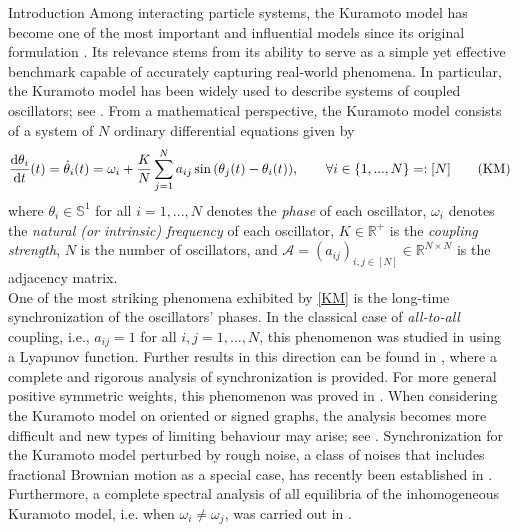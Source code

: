 \documentclass{article}
\theoremstyle{definition}
\newcommand{\R}{\mathbb{R}}
\begin{document}
\begin{section}{Introduction}
Among interacting particle systems, the Kuramoto model has become one of the most important and influential models since its original formulation \cite{kuramoto2003chemical}. Its relevance stems from its ability to serve as a simple yet effective benchmark capable of accurately capturing real-world phenomena. In particular, the Kuramoto model has been widely used to describe systems of coupled oscillators; see \cite{kuramoto2005self}. From a mathematical perspective, the Kuramoto model consists of a system of $N$ ordinary differential equations given by
\begin{equation}\label{KM}
    \frac{\textnormal{d}\theta_i}{\textnormal{d}t}(t)=\dot{\theta}_i(t)=\omega_i+\frac{K}{N}\sum_{j=1}^Na_{ij}\sin{\left(\theta_j(t)-\theta_i(t)\right)},\qquad\forall i\in \{1,...,N\}=:[N]\tag{KM}
\end{equation}
where $\theta_i\in\mathbb{S}^1$ for all $i=1,...,N$ denotes the \textit{phase} of each oscillator, $\omega_i$ denotes the \textit{natural (or intrinsic) frequency} of each oscillator, $K\in\mathbb{R}^+$ is the \textit{coupling strength}, $N$ is the number of oscillators, and $\mathcal{A}=(a_{ij})_{i,j\in[N]}\in\R^{N\times N}$ is the adjacency matrix.\\

One of the most striking phenomena exhibited by \eqref{KM} is the long-time synchronization of the oscillators' phases. In the classical case of \textit{all-to-all} coupling, i.e., $a_{ij}=1$ for all $i,j=1,\ldots,N$, this phenomenon was studied in \cite{van1993lyapunov} using a Lyapunov function. Further results in this direction can be found in \cite{benedetto2014complete,dong2013synchronization,ha2010complete}, where a complete and rigorous analysis of synchronization is provided. For more general positive symmetric weights, this phenomenon was proved in \cite{jadbabaie2004stability}. When considering the Kuramoto model on oriented or signed graphs, the analysis becomes more difficult and new types of limiting behaviour may arise; see \cite{delabays2019kuramoto,burylko2014bifurcation,yoon2026stability,hong2011kuramoto}. Synchronization for the Kuramoto model perturbed by rough noise, a class of noises that includes fractional Brownian motion as a special case, has recently been established in \cite{neamtu2026synchronization}. Furthermore, a complete spectral analysis of all equilibria of the inhomogeneous Kuramoto model, i.e. when $\omega_i\neq\omega_j$, was carried out in \cite{mirollo2005spectrum}.\\


\end{section}
\end{document}
